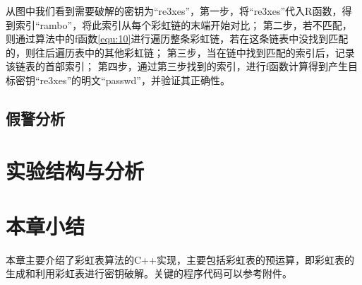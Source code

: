从图中我们看到需要破解的密钥为“re3xes”，第一步，将“re3xes”代入R函数，得到索引“rambo”，将此索引从每个彩虹链的末端开始对比；
第二步，若不匹配，则通过算法中的f函数\eqref{equ:10}进行遍历整条彩虹链，若在这条链表中没找到匹配的，则往后遍历表中的其他彩虹链；
第三步，当在链中找到匹配的索引后，记录该链表的首部索引；
第四步，通过第三步找到的索引，进行f函数计算得到产生目标密钥“re3xes”的明文“passwd”，并验证其正确性。
\subsection{假警分析}

\section{实验结构与分析}
\section{本章小结}
本章主要介绍了彩虹表算法的C++实现，主要包括彩虹表的预运算，即彩虹表的生成和利用彩虹表进行密钥破解。关键的程序代码可以参考附件。
